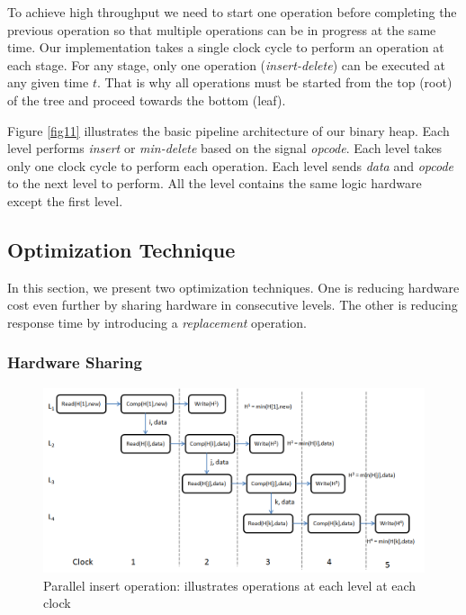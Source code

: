 \documentclass[10pt, conference, compsocconf]{IEEEtran}
\begin{document}





To achieve high throughput we need to start one operation before completing the previous operation so that multiple operations can be in progress at the same time.
Our implementation takes a single clock cycle to perform an operation at each stage.
For any stage, only one operation ({\it insert-delete}) can be executed at any given time $t$.
That is why all operations must be started from the top (root) of the tree and proceed towards the bottom (leaf).

Figure \ref{fig11} illustrates the basic pipeline architecture of our binary heap.
Each level performs {\it insert} or {\it min-delete} based on the signal {\it opcode}.
Each level takes only one clock cycle to perform each operation.
Each level sends {\it data} and {\it opcode} to the next level to perform.
All the level contains the same logic hardware except the first level.


\subsection{Optimization Technique}

In this section, we present two optimization techniques.
One is reducing hardware cost even further by sharing hardware in consecutive levels.
The other is reducing response time by introducing a {\it replacement} operation.

\subsubsection{Hardware Sharing}

\begin{figure}[!ht]
  \centering
  \includegraphics[width=12cm]{Figures/clock1.png}
      \caption{Parallel insert operation: illustrates operations at each level at each clock }
    \label{clock1}
\end{figure}
\end{document}
